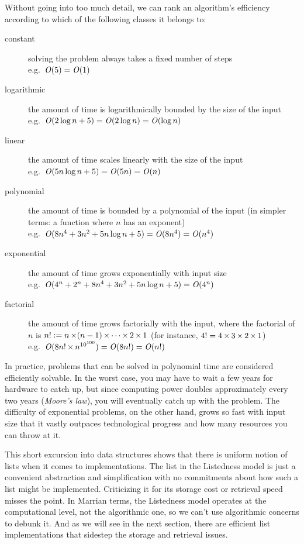 \begin{programming}
\begin{techinfo}
    Without going into too much detail, we can rank an algorithm's efficiency according to which of the following classes it belongs to:
    \begin{description}
        \item[constant]
            solving the problem always takes a fixed number of steps\\
            e.g.\ $\mathit{O}(5) = \mathit{O}(1)$
        \item[logarithmic]
            the amount of time is logarithmically bounded by the size of the input\\
            e.g.\ $\mathit{O}(2 \log n + 5) = \mathit{O}(2 \log n) = \mathit{O}(\log n)$
        \item[linear]
            the amount of time scales linearly with the size of the input\\
            e.g.\ $\mathit{O}(5n \log n + 5) = \mathit{O}(5n) = \mathit{O}(n)$
        \item[polynomial]
            the amount of time is bounded by a polynomial of the input (in simpler terms: a function where $n$ has an exponent)\\
            e.g.\ $\mathit{O}(8n^4 + 3n^2 + 5n \log n + 5) = \mathit{O}(8n^4) = \mathit{O}(n^4)$
        \item[exponential]
            the amount of time grows exponentially with input size\\
            e.g.\ $\mathit{O}(4^n + 2^n + 8n^4 + 3n^2 + 5n \log n + 5) = \mathit{O}(4^n)$
        \item[factorial]
            the amount of time grows factorially with the input, where the factorial of $n$ is $n! \mathrel{\mathop:}= n \mathop{\times} (n - 1) \mathop{\times} \cdots \mathop{\times} 2 \mathop{\times} 1$ (for instance, $4! = 4 \mathop{\times} 3 \mathop{\times} 2 \mathop{\times} 1$)\\
            e.g.\ $\mathit{O}(8n! \mathop{\times} n^{10^{100}}) = \mathit{O}(8n!) = \mathit{O}(n!)$
    \end{description}
    In practice, problems that can be solved in polynomial time are considered efficiently solvable.
    In the worst case, you may have to wait a few years for hardware to catch up, but since computing power doubles approximately every two years (\emph{Moore's law}), you will eventually catch up with the problem.
    The difficulty of exponential problems, on the other hand, grows so fast with input size that it vastly outpaces technological progress and how many resources you can throw at it.
\end{techinfo}

This short excursion into data structures shows that there is uniform notion of lists when it comes to implementations.
The list in the Listedness model is just a convenient abstraction and simplification with no commitments about how such a list might be implemented.
Criticizing it for its storage cost or retrieval speed misses the point.
In Marrian terms, the Listedness model operates at the computational level, not the algorithmic one, so we can't use algorithmic concerns to debunk it.
And as we will see in the next section, there are efficient list implementations that sidestep the storage and retrieval issues.


\end{programming}
